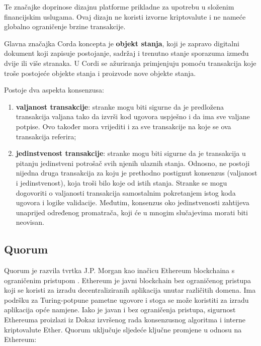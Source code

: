 \documentclass[times, utf8, diplomski]{fer}
\begin{document}
Te značajke doprinose dizajnu platforme prikladne za upotrebu u složenim  financijskim uslugama. Ovaj dizajn ne koristi izvorne kriptovalute i ne nameće globalno ograničenje brzine transakcije.

Glavna značajka Corda koncepta je \textbf{objekt stanja}, koji je zapravo digitalni dokument koji zapisuje postojanje, sadržaj i trenutno stanje sporazuma između dvije ili više stranaka. U Cordi se ažuriranja primjenjuju pomoću transakcija koje troše postojeće objekte stanja i proizvode nove objekte stanja. 

Postoje dva aspekta konsenzusa:

\begin{enumerate}

\item \textbf{valjanost transakcije}: stranke mogu biti sigurne da je predložena transakcija valjana tako da izvrši kod ugovora uspješno i da ima sve valjane potpise. Ovo također mora vrijediti i za sve transakcije na koje se ova transakcija referira;

\item \textbf{jedinstvenost transakcije}: stranke mogu biti sigurne da je transakcija u pitanju jedinstveni potrošač svih njenih ulaznih stanja. Odnosno, ne postoji nijedna druga transakcija za koju je prethodno postignut konsenzus (valjanost i jedinstvenost), koja troši bilo koje od istih stanja. Stranke se mogu dogovoriti o valjanosti transakcija samostalnim pokretanjem istog koda ugovora i logike validacije. Međutim, konsenzus oko jedinstvenosti zahtijeva unaprijed određenog promatrača,  koji će u mnogim slučajevima morati biti neovisan.

\end{enumerate}

\subsection{Quorum}

Quorum je razvila tvrtka J.P. Morgan kao inačicu Ethereum blockchaina s ograničenim pristupom \cite{Quorum}. Ethereum je javni blockchain bez ograničenog pristupa koji se koristi za izradu decentraliziranih aplikacija unutar različitih domena. Ima podršku za Turing-potpune pametne ugovore i stoga se može koristiti za izradu aplikacija opće namjene.  Iako je javan i bez ograničenja pristupa, sigurnost Ethereuma proizlazi iz Dokaz izvršenog rada konsenzusnog algoritma i interne kriptovalute Ether. Quorum uključuje sljedeće ključne promjene u odnosu na Ethereum:
\end{document}
